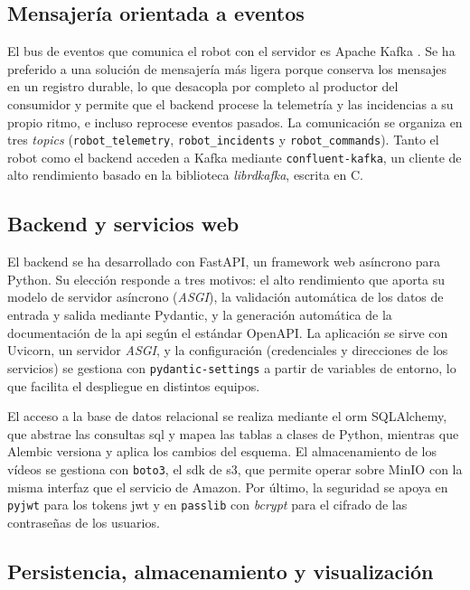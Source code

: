 \subsection{Mensajería orientada a eventos}

El bus de eventos que comunica el robot con el servidor es Apache Kafka
\parencite{kreps2011kafka}. Se ha preferido a una solución de mensajería más
ligera porque conserva los mensajes en un registro durable, lo que desacopla por
completo al productor del consumidor y permite que el backend procese la
telemetría y las incidencias a su propio ritmo, e incluso reprocese eventos
pasados. La comunicación se organiza en tres \textit{topics}
(\texttt{robot\_telemetry}, \texttt{robot\_incidents} y \texttt{robot\_commands}).
Tanto el robot como el backend acceden a Kafka mediante \texttt{confluent-kafka},
un cliente de alto rendimiento basado en la biblioteca \textit{librdkafka},
escrita en C.

\subsection{Backend y servicios web}

El backend se ha desarrollado con FastAPI, un framework web asíncrono para Python.
Su elección responde a tres motivos: el alto rendimiento que aporta su modelo de
servidor asíncrono (\textit{ASGI}), la validación automática de los datos de
entrada y salida mediante Pydantic, y la generación automática de la documentación
de la \gls{api} según el estándar OpenAPI. La aplicación se sirve con Uvicorn, un
servidor \textit{ASGI}, y la configuración (credenciales y direcciones de los
servicios) se gestiona con \texttt{pydantic-settings} a partir de variables de
entorno, lo que facilita el despliegue en distintos equipos.

El acceso a la base de datos relacional se realiza mediante el \gls{orm}
SQLAlchemy, que abstrae las consultas \gls{sql} y mapea las tablas a clases de
Python, mientras que Alembic versiona y aplica los cambios del esquema. El
almacenamiento de los vídeos se gestiona con \texttt{boto3}, el \gls{sdk} de
\gls{s3}, que permite operar sobre MinIO con la misma interfaz que el servicio de
Amazon. Por último, la seguridad se apoya en \texttt{pyjwt} para los tokens
\gls{jwt} y en \texttt{passlib} con \textit{bcrypt} para el cifrado de las
contraseñas de los usuarios.

\subsection{Persistencia, almacenamiento y visualización}

